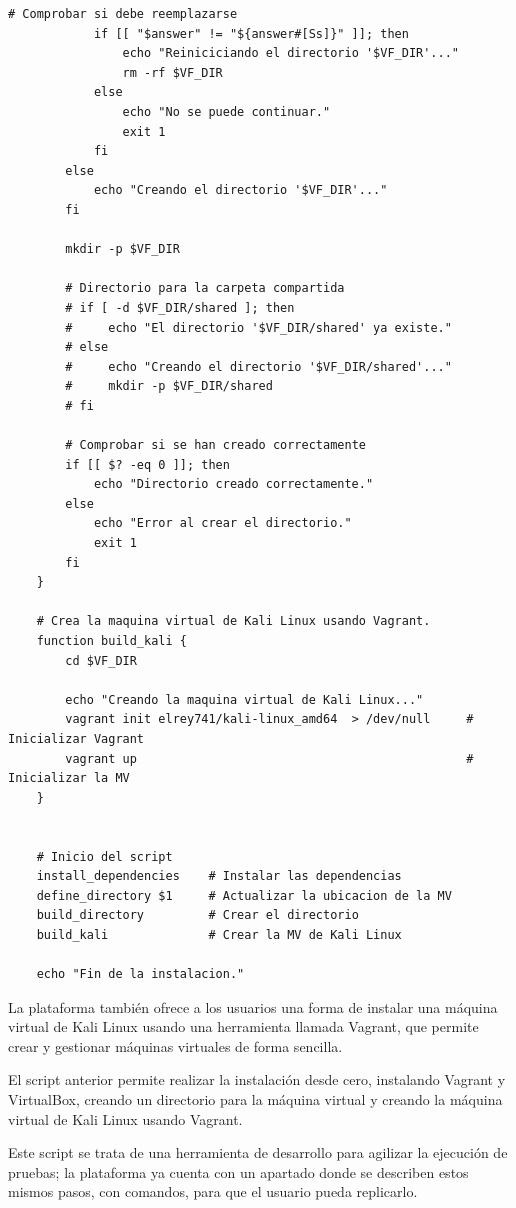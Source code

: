 \begin{appendices}
\begin{lstlisting}[style=bash_style, basicstyle=\ttfamily\scriptsize]
            # Comprobar si debe reemplazarse
            if [[ "$answer" != "${answer#[Ss]}" ]]; then
                echo "Reiniciciando el directorio '$VF_DIR'..."
                rm -rf $VF_DIR
            else
                echo "No se puede continuar."
                exit 1
            fi
        else
            echo "Creando el directorio '$VF_DIR'..."
        fi
    
        mkdir -p $VF_DIR
    
        # Directorio para la carpeta compartida
        # if [ -d $VF_DIR/shared ]; then
        #     echo "El directorio '$VF_DIR/shared' ya existe."
        # else
        #     echo "Creando el directorio '$VF_DIR/shared'..."
        #     mkdir -p $VF_DIR/shared
        # fi
    
        # Comprobar si se han creado correctamente
        if [[ $? -eq 0 ]]; then
            echo "Directorio creado correctamente."
        else
            echo "Error al crear el directorio."
            exit 1
        fi
    }
    
    # Crea la maquina virtual de Kali Linux usando Vagrant.
    function build_kali {
        cd $VF_DIR
    
        echo "Creando la maquina virtual de Kali Linux..."
        vagrant init elrey741/kali-linux_amd64  > /dev/null     # Inicializar Vagrant
        vagrant up                                              # Inicializar la MV
    }
    
    
    # Inicio del script
    install_dependencies    # Instalar las dependencias
    define_directory $1     # Actualizar la ubicacion de la MV
    build_directory         # Crear el directorio
    build_kali              # Crear la MV de Kali Linux
    
    echo "Fin de la instalacion."
                \end{lstlisting}

                La plataforma también ofrece a los usuarios una forma de instalar una máquina virtual de Kali Linux usando una herramienta llamada Vagrant, que permite crear y gestionar máquinas virtuales de forma sencilla.

                El script anterior permite realizar la instalación desde cero, instalando Vagrant y VirtualBox, creando un directorio para la máquina virtual y creando la máquina virtual de Kali Linux usando Vagrant.

                Este script se trata de una herramienta de desarrollo para agilizar la ejecución de pruebas; la plataforma ya cuenta con un apartado donde se describen estos mismos pasos, con comandos, para que el usuario pueda replicarlo.


\end{appendices}
